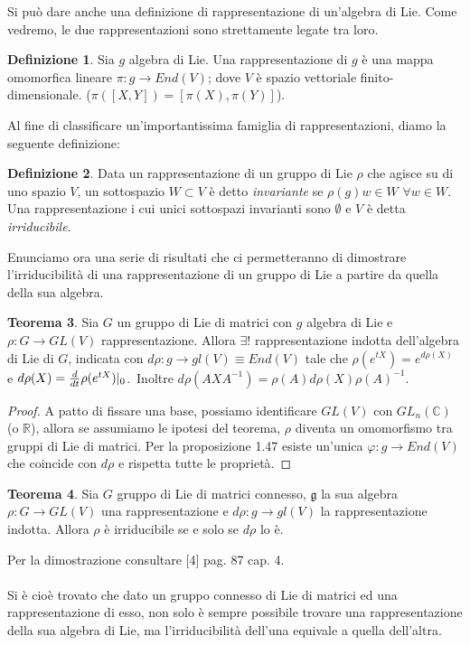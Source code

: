 \documentclass[12pt,a4paper]{report}
\theoremstyle{definition}
\newtheorem{Def}{Definizione}[chapter]
\newtheorem{Theo}[Def]{Teorema}
\theoremstyle{definition}
\theoremstyle{definition}
\theoremstyle{remark}
\begin{document}
Si può dare anche una definizione di rappresentazione di un'algebra di Lie. Come vedremo, le due rappresentazioni sono strettamente legate tra loro.
\begin{Def}
	Sia $g$ algebra di Lie. Una rappresentazione di $g$ è una mappa omomorfica lineare $\pi:g\rightarrow End(V)$; dove $V$ è spazio vettoriale finito-dimensionale. ($\pi([X,Y])=[\pi(X),\pi(Y)]$).
\end{Def}
Al fine di classificare un'importantissima famiglia di rappresentazioni, diamo la seguente definizione:
\begin{Def}
	Data un rappresentazione di un gruppo di Lie $\rho$ che agisce su di uno spazio $V$, un sottospazio $W\subset V$ è detto \textit{invariante} se $\rho(g)w\in W$ $\forall w\in W$.\\
	Una rappresentazione i cui unici sottospazi invarianti sono $\emptyset$ e $V$ è detta \textit{irriducibile}.
\end{Def}
Enunciamo ora una serie di risultati che ci permetteranno di dimostrare l'irriducibilità di una rappresentazione di un gruppo di Lie a partire da quella della sua algebra.
\begin{Theo}
	Sia $G$ un gruppo di Lie di matrici con $g$ algebra di Lie e $\rho:G\rightarrow GL(V)$ rappresentazione. Allora $\exists!$ rappresentazione indotta dell'algebra di Lie di $G$, indicata con $d\rho:g\rightarrow gl(V)\equiv End(V)$ tale che $\rho(e^{tX})=e^{d\rho(X)}$ e $d\rho(X)={d\over dt}\rho(e^{tX})|_0$.\
	Inoltre $d\rho(AXA^{-1})=\rho(A)d\rho(X)\rho(A)^{-1}$.	
\end{Theo}
\begin{proof}
	A patto di fissare una base, possiamo identificare $GL(V)$ con $GL_n(\mathbb{C})$ (o $\mathbb{R}$), allora se assumiamo le ipotesi del teorema, $\rho$ diventa un omomorfismo tra gruppi di Lie di matrici. Per la proposizione 1.47 esiste un'unica $\varphi:g\rightarrow End(V)$ che coincide con $d\rho$ e rispetta tutte le proprietà.
\end{proof}
\begin{Theo}
	Sia $G$ gruppo di Lie di matrici connesso, $\mathfrak{g}$ la sua algebra $\rho:G\rightarrow GL(V)$ una rappresentazione e $d\rho:g\rightarrow gl(V)$ la rappresentazione indotta. Allora $\rho$ è irriducibile se e solo se $d\rho$ lo è.
\end{Theo}
Per la dimostrazione consultare [4] pag. 87 cap. 4.\\
\\
Si è cioè trovato che dato un gruppo connesso di Lie di matrici ed una rappresentazione di esso, non solo è sempre possibile trovare una rappresentazione della sua algebra di Lie, ma l'irriducibilità dell'una equivale a quella dell'altra.
\end{document}
